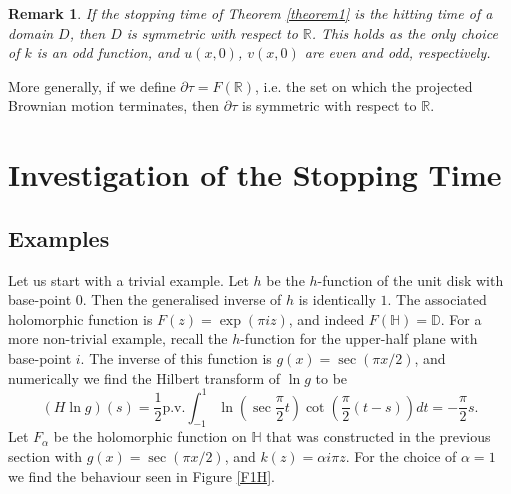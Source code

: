 \documentclass[a4paper, oneside, 12pt]{amsart}
\newtheorem{remark}{Remark}
\newcommand{\D}{\mathbb{D}}
\renewcommand{\H}{\mathbb{H}}
\newcommand{\R}{\mathbb{R}}
\newcommand{\fr}{\frac}
\begin{document}
\begin{remark}\label{corr1}
    If the stopping time of Theorem \ref{theorem1} is the hitting time of a domain $D$, then $D$ is symmetric with respect to $\R$. This holds as 
    the only choice of $k$ is an odd function, and $u(x,0)$, $v(x,0)$ are even and odd, respectively.
\end{remark}

More generally, if we define $\partial \tau = F(\R)$, i.e. the set on which the projected Brownian motion terminates, then $\partial \tau$ is symmetric with respect to $\R$.

\section{Investigation of the Stopping Time}\label{sec4}
\subsection{Examples}
Let us start with a trivial example. Let $h$ be the $h$-function of the unit
disk with base-point $0$. Then the generalised inverse of $h$ is identically
$1$. The associated holomorphic function is $F(z) = \exp(\pi i z)$, and indeed
$F(\H) = \D$. For a more non-trivial example, recall the $h$-function for the
upper-half plane with base-point $i$. The inverse of this function is $g(x) =
\sec(\pi x/2 )$, and numerically we find 
the Hilbert transform of $\ln g$ to be
$$
    (H \ln g)(s) = \fr{1}{2} \text{p.v.} \int_{-1}^1 \ln\left(\sec\fr{\pi}{2} t\right) \cot\left(\fr{\pi}{2}(t-s)\right) dt = -\fr{\pi}{2} s.
$$
Let $F_\alpha$ be the holomorphic function on $\H$ that was constructed in the previous section with $g(x) = \sec(\pi x/2)$, and $k(z) = \alpha i\pi z$.
For the choice of $\alpha = 1$ we find the behaviour seen in Figure \ref{F1H}.
\end{document}
